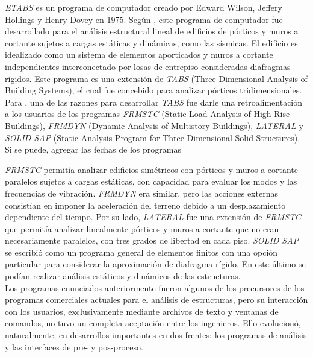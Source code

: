 \begin{nota}
\emph{ETABS} es un programa de computador creado por Edward Wilson, Jeffery Hollings y Henry Dovey en 1975. Según \textcite{ETABS1975}, este programa de computador fue desarrollado para el análisis estructural lineal de edificios de pórticos y muros a cortante sujetos a cargas estáticas y dinámicas, como las sísmicas. El edificio es idealizado como un sistema de elementos aporticados y muros a cortante independientes interconectado por losas de entrepiso consideradas diafragmas rígidos. Este programa es una extensión de \emph{TABS} (Three Dimensional Analysis of Building Systems), el cual fue concebido para analizar pórticos tridimensionales. Para \textcite{ETABS1972}, una de las razones para desarrollar \emph{TABS} fue darle una retroalimentación a los usuarios de los programas \emph{FRMSTC} (Static Load Analysis of High-Rise Buildings), \emph{FRMDYN} (Dynamic Analysis of Multistory Buildings), \emph{LATERAL} y \emph{SOLID SAP} (Static Analysis Program for Three-Dimensional Solid Structures).\\
\tcblower
Si se puede, agregar las fechas de los programas
\end{nota}

\emph{FRMSTC} permitía analizar edificios simétricos con pórticos y muros a cortante paralelos sujetos a cargas estáticas, con capacidad para evaluar los modos y las frecuencias de vibración. \emph{FRMDYN} era similar, pero las acciones externas consistían en imponer la aceleración del terreno debido a un desplazamiento dependiente del tiempo. Por su lado, \emph{LATERAL} fue una extensión de \emph{FRMSTC} que permitía analizar linealmente pórticos y muros a cortante que no eran necesariamente paralelos, con tres grados de libertad en cada piso. \emph{SOLID SAP} se escribió como un programa general de elementos finitos con una opción particular para considerar la aproximación de diafragma rígido. En este último se podían realizar análisis estáticos y dinámicos de las estructuras.\\

Los programas enunciados anteriormente fueron algunos de los precursores de los programas comerciales actuales para el análisis de estructuras, pero su interacción con los usuarios, exclusivamente mediante archivos de texto y ventanas de comandos, no tuvo un completa aceptación entre los ingenieros. Ello evolucionó, naturalmente, en desarrollos importantes en dos frentes: los programas de análisis y las interfaces de pre- y pos-proceso. 


